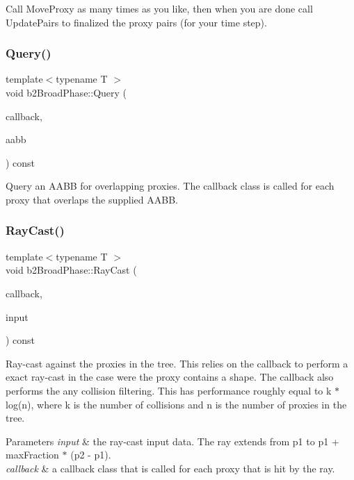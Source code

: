 Call Move\+Proxy as many times as you like, then when you are done call Update\+Pairs to finalized the proxy pairs (for your time step). \mbox{\label{classb2BroadPhase_a187586ea98b9d16e5ef6e12fa31f8de2}} 
\subsubsection{\texorpdfstring{Query()}{Query()}}
{\footnotesize\ttfamily template$<$typename T $>$ \\
void b2\+Broad\+Phase\+::\+Query (\begin{DoxyParamCaption}\item[{T $\ast$}]{callback,  }\item[{const \mbox{\hyperlink{structb2AABB}{b2\+A\+A\+BB}} \&}]{aabb }\end{DoxyParamCaption}) const\hspace{0.3cm}{\ttfamily [inline]}}

Query an A\+A\+BB for overlapping proxies. The callback class is called for each proxy that overlaps the supplied A\+A\+BB. \mbox{\label{classb2BroadPhase_ae65392ea91c7d0839ed5312f78b2837a}} 
\subsubsection{\texorpdfstring{Ray\+Cast()}{RayCast()}}
{\footnotesize\ttfamily template$<$typename T $>$ \\
void b2\+Broad\+Phase\+::\+Ray\+Cast (\begin{DoxyParamCaption}\item[{T $\ast$}]{callback,  }\item[{const \mbox{\hyperlink{structb2RayCastInput}{b2\+Ray\+Cast\+Input}} \&}]{input }\end{DoxyParamCaption}) const\hspace{0.3cm}{\ttfamily [inline]}}

Ray-\/cast against the proxies in the tree. This relies on the callback to perform a exact ray-\/cast in the case were the proxy contains a shape. The callback also performs the any collision filtering. This has performance roughly equal to k $\ast$ log(n), where k is the number of collisions and n is the number of proxies in the tree. 
\begin{DoxyParams}{Parameters}
{\em input} & the ray-\/cast input data. The ray extends from p1 to p1 + max\+Fraction $\ast$ (p2 -\/ p1). \\
\hline
{\em callback} & a callback class that is called for each proxy that is hit by the ray. \\
\hline
\end{DoxyParams}
\mbox{\label{classb2BroadPhase_a410e6115e3d1b4fca61cfbf397767772}} 
